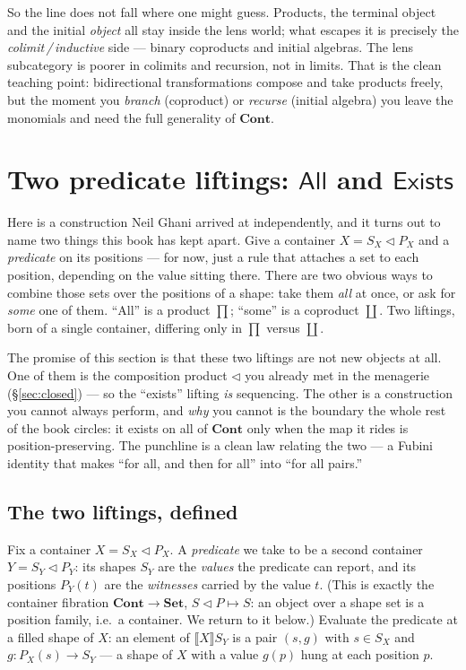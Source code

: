 \documentclass[11pt,a4paper]{book}
\newcommand{\Set}{\mathbf{Set}}
\newcommand{\Cont}{\mathbf{Cont}}
\newcommand{\cont}[2]{#1 \triangleleft #2}
\newcommand{\Ext}[1]{\llbracket #1 \rrbracket}
\theoremstyle{plain}
\theoremstyle{definition}
\theoremstyle{remark}
\begin{document}
So the line does not fall where one might guess. Products, the terminal object and
the initial \emph{object} all stay inside the lens world; what escapes it is
precisely the \emph{colimit\,/\,inductive} side --- binary coproducts and initial
algebras. The lens subcategory is poorer in colimits and recursion, not in limits.
That is the clean teaching point: bidirectional transformations compose and take
products freely, but the moment you \emph{branch} (coproduct) or \emph{recurse}
(initial algebra) you leave the monomials and need the full generality of
$\Cont$.

\section{Two predicate liftings: \texorpdfstring{$\mathsf{All}$}{All} and \texorpdfstring{$\mathsf{Exists}$}{Exists}}
\label{sec:predicate-liftings}

Here is a construction Neil Ghani arrived at independently, and it turns out to
name two things this book has kept apart. Give a container $X=\cont{S_X}{P_X}$ and
a \emph{predicate} on its positions --- for now, just a rule that attaches a set to
each position, depending on the value sitting there. There are two obvious ways to combine those sets over the
positions of a shape: take them \emph{all} at once, or ask for \emph{some} one of
them. ``All'' is a product $\prod$; ``some'' is a coproduct $\coprod$. Two
liftings, born of a single container, differing only in $\prod$ versus $\coprod$.

The promise of this section is that these two liftings are not new objects at all.
One of them is the composition product $\triangleleft$ you already met in the
menagerie (\S\ref{sec:closed}) --- so the ``exists'' lifting \emph{is} sequencing.
The other is a construction you cannot always perform, and \emph{why} you cannot is
the boundary the whole rest of the book circles: it exists on all of $\Cont$ only
when the map it rides is position-preserving. The punchline is a clean law relating
the two --- a Fubini identity that makes ``for all, and then for all'' into ``for
all pairs.''

\subsection{The two liftings, defined}

Fix a container $X=\cont{S_X}{P_X}$. A \emph{predicate} we take to be a second
container $Y=\cont{S_Y}{P_Y}$: its shapes $S_Y$ are the \emph{values} the predicate
can report, and its positions $P_Y(t)$ are the \emph{witnesses} carried by the
value $t$. (This is exactly the container fibration $\Cont\to\Set$,
$\cont SP\mapsto S$: an object over a shape set is a position family, i.e.\ a
container. We return to it below.) Evaluate the predicate at a filled shape of $X$:
an element of $\Ext X{S_Y}$ is a pair $(s,g)$ with $s\in S_X$ and
$g\colon P_X(s)\to S_Y$ --- a shape of $X$ with a value $g(p)$ hung at each
position $p$.
\end{document}
